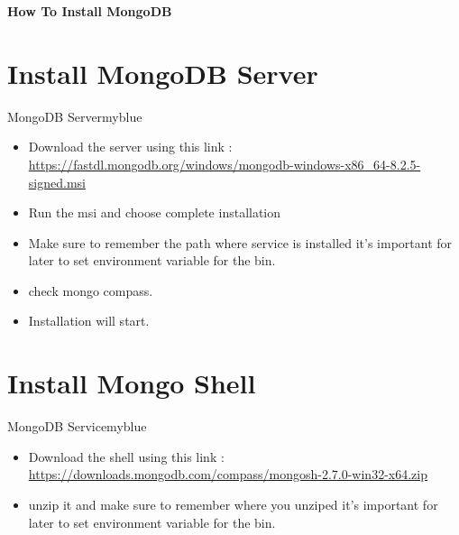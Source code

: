 \documentclass{article}
\newcommand{\tit}[1]{
\begin{center}
    \Large{\textbf{{#1}}}
\end{center}
}
\begin{document}
\tit{How To Install MongoDB}

\vspace{0.5cm}

\section{Install MongoDB Server}
\begin{prettyBox}{MongoDB Server}{myblue}
    \begin{itemize}
        \item Download the server using this link : \href{https://fastdl.mongodb.org/windows/mongodb-windows-x86_64-8.2.5-signed.msi}{https://fastdl.mongodb.org/windows/mongodb-windows-x86_64-8.2.5-signed.msi}
        \item Run the msi and choose complete installation
        \item Make sure to remember the path where service is installed it's important for later to set environment variable for the bin.
        \item check mongo compass.
        \item Installation will start.
    \end{itemize}
   
\end{prettyBox}

\section{Install Mongo Shell}
\begin{prettyBox}{MongoDB Service}{myblue}
    \begin{itemize}
        \item Download the shell using this link : 
\href{https://downloads.mongodb.com/compass/mongosh-2.7.0-win32-x64.zip}{https://downloads.mongodb.com/compass/mongosh-2.7.0-win32-x64.zip} 
       \item unzip it and make sure to remember where you unziped it's important for later to set environment variable for the bin.
    \end{itemize}
\end{prettyBox}
\end{document}
